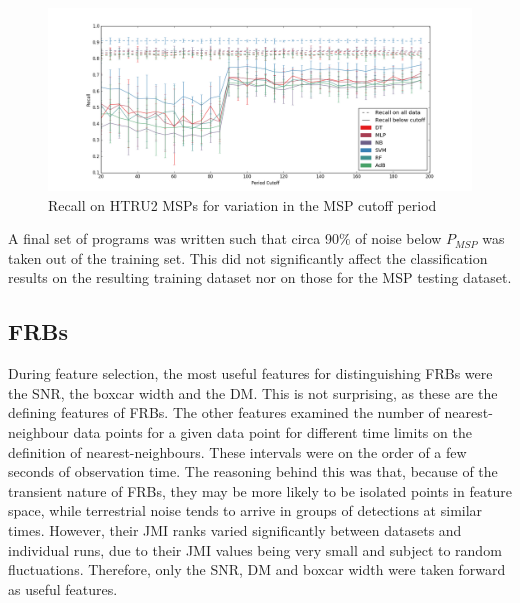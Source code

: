 \documentclass[12pt]{article}
\begin{document}
\begin{figure}[h!]
\begin{center}
\includegraphics[scale=0.3]{acc_vs_period_v2_zoom.png}
\caption{Recall on HTRU2 MSPs for variation in the MSP cutoff period}
\label{allnoiseacc}
\end{center}
\end{figure}

A final set of programs was written such that circa 90$\%$ of noise below $P_{MSP}$ was taken out of the training set. This did not significantly affect the classification results on the resulting training dataset nor on those for the MSP testing dataset.
\paragraph{}



\subsection{FRBs}
During feature selection, the most useful features for distinguishing FRBs were the SNR, the boxcar width and the DM. This is not surprising, as these are the defining features of FRBs. The other features examined the number of nearest-neighbour data points for a given data point for different time limits on the definition of nearest-neighbours. These intervals were on the order of a few seconds of observation time. The reasoning behind this was that, because of the transient nature of FRBs, they may be more likely to be isolated points in feature space, while terrestrial noise tends to arrive in groups of detections at similar times. However, their JMI ranks varied significantly between datasets and individual runs, due to their JMI values being very small and subject to random fluctuations. Therefore, only the SNR, DM and boxcar width were taken forward as useful features.
\end{document}
